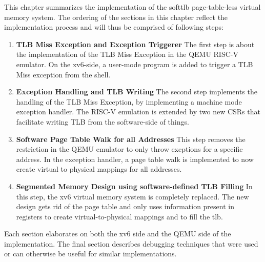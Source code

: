 This chapter summarizes the implementation of the softtlb page-table-less virtual memory system.
The ordering of the sections in this chapter reflect the implementation process and will thus
be comprised of following steps:
\begin{enumerate}
    \item \textbf{TLB Miss Exception and Exception Triggerer} The first step is about
          the implementation of the TLB Miss Exception in the QEMU RISC-V emulator. On the xv6-side,
          a user-mode program is added to trigger a TLB Miss exception from the shell.
    \item \textbf{Exception Handling and TLB Writing} The second step implements the
          handling of the TLB Miss Exception, by implementing a machine mode exception handler.
          The RISC-V emulation is extended by two new CSRs that facilitate writing TLB from the
          software-side of things.
    \item \textbf{Software Page Table Walk for all Addresses} This step removes the restriction
          in the QEMU emulator to only throw exeptions for a specific address. In the exception handler,
          a page table walk is implemented to now create virtual to physical mappings for all addresses.
    \item \textbf{Segmented Memory Design using software-defined TLB Filling} In this step, the xv6 virtual memory system is completely
          replaced. The new design gets rid of the page table and only uses information present in
          registers to create virtual-to-physical mappings and to fill the tlb.
\end{enumerate}
Each section elaborates on both the xv6 side and the QEMU side of the implementation.
The final section describes debugging techniques that were used or can otherwise be useful for
similar implementations.

